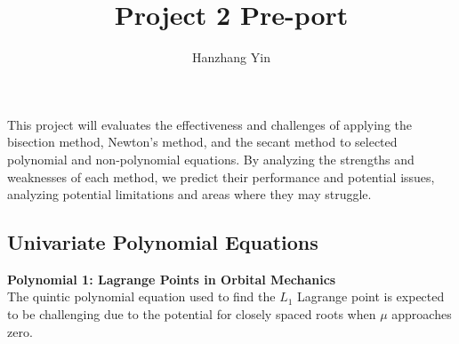 \documentclass[12pt]{article}
\title{\vspace{-2cm}Project 2 Pre-port}
\author{Hanzhang Yin}
\begin{document}
\maketitle

This project will evaluates the effectiveness and challenges of applying the bisection method, Newton's method, and the secant method to selected polynomial and non-polynomial equations. By analyzing the strengths and weaknesses of each method, we predict their performance and potential issues, analyzing potential limitations and areas where they may struggle.

\subsection*{Univariate Polynomial Equations}

\noindent \textbf{Polynomial 1: Lagrange Points in Orbital Mechanics}
\\
\noindent The quintic polynomial equation used to find the \( L_1 \) Lagrange point is expected to be challenging due to the potential for closely spaced roots when \( \mu \) approaches zero.
\end{document}
